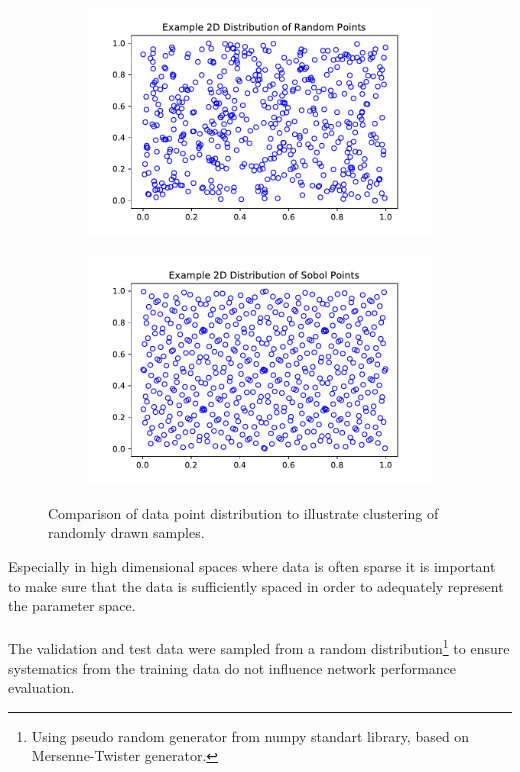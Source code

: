 		\begin{figure}
			\centering
			\begin{subfigure}{.48\textwidth}
				\centering
				\includegraphics[width=\textwidth]{images/2D_Dist_Rand512.pdf}
				\label{Fig:DistRand}
			\end{subfigure}
			\begin{subfigure}{.48\textwidth}
				\centering
				\includegraphics[width=\textwidth]{images/2D_Dist_Sobol512.pdf}
				\label{Fig:DistSobol}
			\end{subfigure}
			\caption{Comparison of data point distribution to illustrate clustering of randomly drawn samples.}
			\label{Fig:512Dist}
		\end{figure}
		Especially in high dimensional spaces where data is often sparse it is important to make sure that the data is sufficiently spaced in order to adequately represent the parameter space.\\
		~\\
		The validation and test data were sampled from a random distribution\footnote{Using pseudo random generator from numpy standart library, based on Mersenne-Twister generator.} to ensure systematics from the training data do not influence network performance evaluation.
		